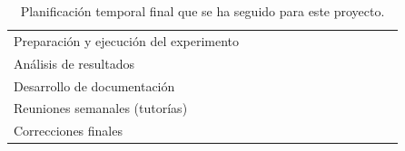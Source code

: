 \documentclass[oneside,openright,titlepage,numbers=noenddot,openany,headinclude,footinclude=true,
cleardoublepage=empty,abstractoff,BCOR=5mm,paper=a4,fontsize=12pt,main=spanish]{scrreprt}
\begin{document}
\begin{table}[H]
{\begin{tabular}{l|c|cccccclllll}
Preparación y ejecución del experimento           & \multicolumn{1}{l|}{}    & \multicolumn{1}{l}{} & \multicolumn{1}{l}{}     & \multicolumn{1}{l}{}     & \multicolumn{1}{l}{}     & \multicolumn{1}{l}{}     & \multicolumn{1}{l}{}     &                                              & \multicolumn{1}{c}{}                         & \multicolumn{1}{c}{\cellcolor[HTML]{34FF34}} & \multicolumn{1}{c}{\cellcolor[HTML]{34FF34}} &                                              \\
Análisis de resultados                            & \multicolumn{1}{l|}{}    & \multicolumn{1}{l}{} & \multicolumn{1}{l}{}     & \multicolumn{1}{l}{}     & \multicolumn{1}{l}{}     & \multicolumn{1}{l}{}     & \multicolumn{1}{l}{}     &                                              & \multicolumn{1}{c}{}                         & \multicolumn{1}{c}{}                         & \multicolumn{1}{c}{\cellcolor[HTML]{34FF34}} &                                              \\
Desarrollo de documentación                       & \multicolumn{1}{l|}{}    & \multicolumn{1}{l}{} & \multicolumn{1}{l}{}     & \multicolumn{1}{l}{}     & \cellcolor[HTML]{34FF34} & \cellcolor[HTML]{34FF34} & \cellcolor[HTML]{34FF34} & \multicolumn{1}{c}{\cellcolor[HTML]{34FF34}} & \multicolumn{1}{c}{\cellcolor[HTML]{34FF34}} & \multicolumn{1}{c}{\cellcolor[HTML]{34FF34}} & \multicolumn{1}{c}{\cellcolor[HTML]{34FF34}} & \multicolumn{1}{c}{\cellcolor[HTML]{34FF34}} \\
Reuniones semanales (tutorías)                    & \multicolumn{1}{l|}{}    & \multicolumn{1}{l}{} & \cellcolor[HTML]{34FF34} & \cellcolor[HTML]{34FF34} & \cellcolor[HTML]{34FF34} & \cellcolor[HTML]{34FF34} & \multicolumn{1}{l}{}     &                                              & \multicolumn{1}{c}{}                         & \multicolumn{1}{c}{\cellcolor[HTML]{34FF34}} & \multicolumn{1}{c}{\cellcolor[HTML]{34FF34}} & \multicolumn{1}{c}{\cellcolor[HTML]{34FF34}} \\
Correcciones finales                              & \multicolumn{1}{l|}{}    & \multicolumn{1}{l}{} & \multicolumn{1}{l}{}     & \multicolumn{1}{l}{}     & \multicolumn{1}{l}{}     & \multicolumn{1}{l}{}     & \multicolumn{1}{l}{}     &                                              &                                              & \multicolumn{1}{c}{}                         &                                              & \multicolumn{1}{c}{\cellcolor[HTML]{34FF34}}
\end{tabular}
}
\caption{Planificación temporal final que se ha seguido para este proyecto.}
\label{tab:planific2}
\end{table}
\end{document}
